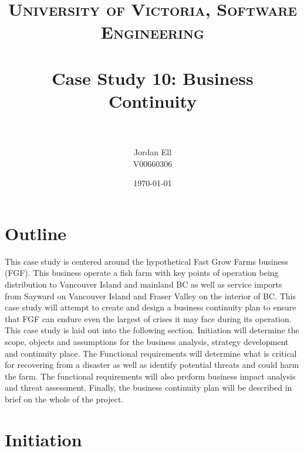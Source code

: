\documentclass[paper=a4, fontsize=11pt]{scrartcl} %
\title{	
\normalfont \normalsize 
\textsc{University of Victoria, Software Engineering} \\ [25pt] %
\horrule{0.5pt} \\[0.4cm] %
\huge Case Study 10: Business Continuity \\ %
\horrule{2pt} \\[0.5cm] %
}
\author{Jordan Ell \\ V00660306} %
\date{\normalsize\today} %
\numberwithin{equation}{section} %
\numberwithin{figure}{section} %
\numberwithin{table}{section} %
\begin{document}
\maketitle %


\section{Outline}

This case study is centered around the hypothetical Fast Grow Farms business (FGF). This
business operate a fish farm with key points of operation being distribution to Vancouver
Island and mainland BC as well as service imports from Sayward on Vancouver Island
and Fraser Valley on the interior of BC. This case study will attempt to create and design
a business continuity plan to ensure that FGF can endure even the largest of crises it
may face during its operation.\\

This case study is laid out into the following section. Initiation will determine the scope,
objects and assumptions for the business analysis, strategy development and continuity
place. The  Functional requirements will determine what is critical for recovering from a
disaster as well as identify potential threats and could harm the farm. The functional
requirements will also preform business impact analysis and threat assessment. Finally,
the business continuity plan will be described in brief on the whole of the project.



\section{Initiation}
\end{document}
